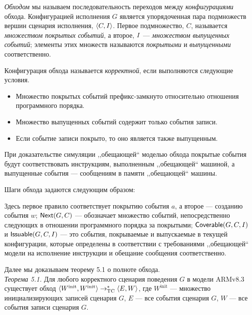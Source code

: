 \emph{Обходом} мы называем последовательность переходов между \emph{конфигурациями} обхода. Конфигурацией исполнения $G$ является
упорядоченная пара подмножеств вершин сценария исполнения, ${\langle{C, I}\rangle}$.
Первое подмножество, $C$, называется \emph{множеством покрытых событий}, а второе, $I$ --- \emph{множеством выпущенных событий};
элементы этих множеств называются \emph{покрытыми} и \emph{выпущенными} соответственно.

Конфигурация обхода называется \emph{корректной}, если выполняются следующие условия.
\begin{itemize}
  \item Множество покрытых событий префикс-замкнуто относительно отношения программного порядка.
  \item Множество выпущенных событий содержит только события записи.
  \item Если событие записи покрыто, то оно является также выпущенным.
\end{itemize}
При доказательстве симуляции ,,обещающей`` моделью обхода покрытые события будут соответствовать инструкциям, выполненным
,,обещающей`` машиной, а выпущенные события --- сообщениям в памяти ,,обещающей`` машины.

Шаги обхода задаются следующим образом:
Здесь первое правило соответствует покрытию события $a$, а второе --- созданию события $w$; ${\sf Next}(G, C)$ --- обозначает множество событий,
непосредственно следующих в отношении программного порядка за покрытыми; ${\sf Coverable}(G, C, I)$ и ${\sf Issuable}(G, C, I)$ --- это
события, покрываемые и выпускаемые в текущей конфигурации, которые определены в соответствии с требованиями ,,обещающей`` модели
на исполнение инструкции и обещание сообщения соответственно.

Далее мы доказываем теорему 5.1 о полноте обхода. \\
\emph{Теорема 5.1.} Для любого корректного сценария поведения $G$ в модели ARMv8.3 существует обход
${\langle{W^{\textrm{init}}, W^{\textrm{init}}}\rangle} \rightarrow_{\rm TC}^{*} {\langle{E, W}\rangle}$,
где $W^{\textrm{init}}$ --- множество инициализирующих записей сценария $G$, $E$ --- все события сценария $G$,
$W$ --- все события записи сценария $G$.

